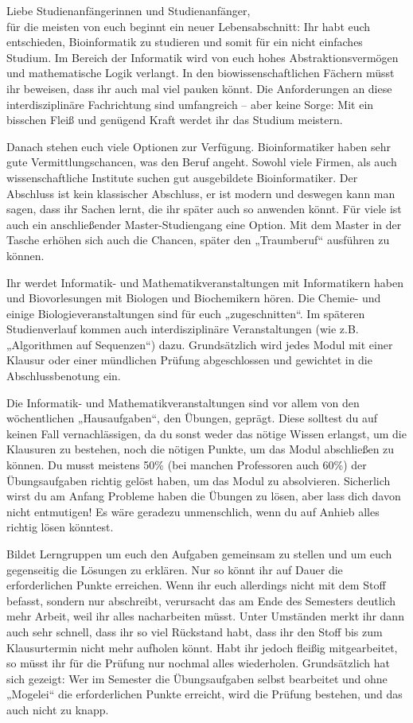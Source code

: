 Liebe Studienanfängerinnen und Studienanfänger,\\
für die meisten von euch beginnt ein neuer Lebensabschnitt:
Ihr habt euch entschieden, Bioinformatik zu studieren und somit für ein nicht einfaches Studium.
Im Bereich der Informatik wird von euch hohes Abstraktionsvermögen und mathematische Logik verlangt.
In den biowissenschaftlichen Fächern müsst ihr beweisen, dass ihr auch mal viel pauken könnt.
Die Anforderungen an diese interdisziplinäre Fachrichtung sind umfangreich – aber keine Sorge:
Mit ein bisschen Fleiß und genügend Kraft werdet ihr das Studium meistern.

Danach stehen euch viele Optionen zur Verfügung.
Bioinformatiker haben sehr gute Vermittlungschancen, was den Beruf angeht.
Sowohl viele Firmen, als auch wissenschaftliche Institute suchen gut ausgebildete Bioinformatiker.
Der Abschluss ist kein klassischer Abschluss, er ist modern und deswegen kann man sagen, dass ihr Sachen lernt, die ihr später auch so anwenden könnt.
Für viele ist auch ein anschließender Master-Studiengang eine Option.
Mit dem Master in der Tasche erhöhen sich auch die Chancen, später den „Traumberuf“ ausführen zu können.

Ihr werdet Informatik- und Mathematikveranstaltungen mit Informatikern haben und Biovorlesungen mit Biologen und Biochemikern hören.
Die Chemie- und einige Biologieveranstaltungen sind für euch „zugeschnitten“.
Im späteren Studienverlauf kommen auch interdisziplinäre Veranstaltungen (wie z.B. „Algorithmen auf Sequenzen“) dazu.
Grundsätzlich wird jedes Modul mit einer Klausur oder einer mündlichen Prüfung abgeschlossen und gewichtet in die Abschlussbenotung ein.

Die Informatik- und Mathematikveranstaltungen sind vor allem von den wöchent\-lichen „Hausaufgaben“, den Übungen, geprägt.
Diese solltest du auf keinen Fall vernachlässigen, da du sonst weder das nötige Wissen erlangst, um die Klausuren zu bestehen, noch die nötigen Punkte, um das Modul abschließen zu können.
Du musst meistens 50\% (bei manchen Professoren auch 60\%) der Übungsaufgaben richtig gelöst haben, um das Modul zu absolvieren.
Sicherlich wirst du am Anfang Probleme haben die Übungen zu lösen, aber lass dich davon nicht entmutigen!
Es wäre geradezu unmenschlich, wenn du auf Anhieb alles richtig lösen könntest.

Bildet Lerngruppen um euch den Aufgaben gemeinsam zu stellen und um euch gegenseitig die Lösungen zu erklären.
Nur so könnt ihr auf Dauer die erforderlichen Punkte erreichen.
Wenn ihr euch allerdings nicht mit dem Stoff befasst, sondern nur abschreibt, verursacht das am Ende des Semesters deutlich mehr Arbeit, weil ihr alles nacharbeiten müsst.
Unter Umständen merkt ihr dann auch sehr schnell, dass ihr so viel Rückstand habt, dass ihr den Stoff bis zum Klausurtermin nicht mehr aufholen könnt. Habt ihr jedoch fleißig mitgearbeitet, so müsst ihr für die Prüfung nur nochmal alles wiederholen.
Grundsätzlich hat sich gezeigt:
Wer im Semester die Übungsaufgaben selbst bearbeitet und ohne „Mogelei“ die erforderlichen Punkte erreicht, wird die Prüfung bestehen, und das auch nicht zu knapp.

